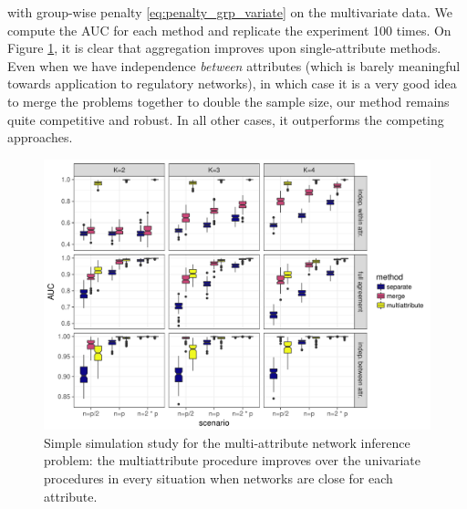with group-wise penalty \eqref{eq:penalty_grp_variate} on the
multivariate data.  We compute the AUC for each method and replicate
the experiment 100 times. On Figure \ref{fig:simu_multi}, it is clear
that aggregation improves upon single-attribute methods. Even when we
have independence \emph{between} attributes (which is barely
meaningful towards application to regulatory networks), in which case
it is a very good idea to merge the problems together to double the
sample size, our method remains quite competitive and robust. In all
other cases, it outperforms the competing approaches.
\begin{figure}[htbp!]
  \centering
  \includegraphics[width=\textwidth]{figures/res_simu_new}
  \caption{Simple simulation study for the multi-attribute network
    inference problem: the multiattribute procedure improves over the
    univariate procedures in every situation when networks are close
    for each attribute.}
  \label{fig:simu_multi}
\end{figure}
